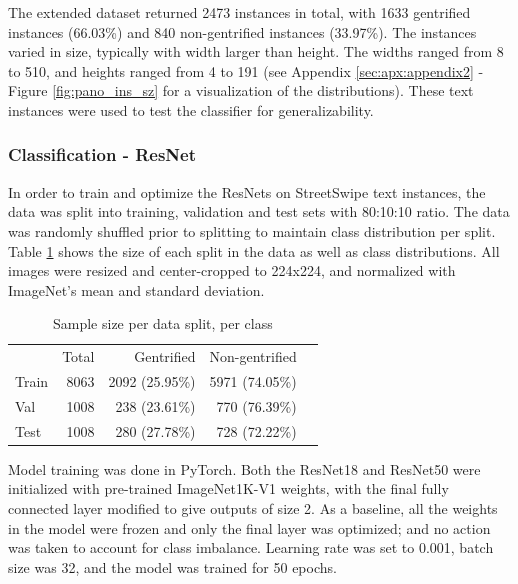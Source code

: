 The extended dataset returned 2473 instances in total, with 1633 gentrified instances (66.03\%) and 840 non-gentrified instances (33.97\%). The instances varied in size, typically with width larger than height. The widths ranged from 8 to 510, and heights ranged from 4 to 191 (see Appendix \ref{sec:apx:appendix2} - Figure \ref{fig:pano_ins_sz} for a visualization of the distributions). These text instances were used to test the classifier for generalizability.


\subsubsection{Classification - ResNet}

In order to train and optimize the ResNets on StreetSwipe text instances, the data was split into training, validation and test sets with 80:10:10 ratio. The data was randomly shuffled prior to splitting to maintain class distribution per split. Table \ref{tab:data_split} shows the size of each split in the data as well as class distributions. All images were resized and center-cropped to 224x224, and normalized with ImageNet's mean and standard deviation.

{
\setlength\intextsep{0pt}
\begin{table}
    \begin{tabular}{lrrrl}
    \toprule
            & \multicolumn{1}{r}{Total} &\multicolumn{1}{r}{Gentrified} & \multicolumn{1}{r}{Non-gentrified} \\ \cline{1-4}
Train       & 8063                      & 2092 (25.95\%)                & 5971 (74.05\%)      \\
Val         & 1008                      & 238 (23.61\%)                 & 770 (76.39\%)       \\
Test        & 1008                      & 280 (27.78\%)                 & 728 (72.22\%)       \\
    \bottomrule
    \end{tabular}
    \caption{Sample size per data split, per class}
    \label{tab:data_split}
\vspace{-10pt}
\end{table}
}

Model training was done in PyTorch. Both the ResNet18 and ResNet50 were initialized with pre-trained ImageNet1K-V1 weights, with the final fully connected layer modified to give outputs of size 2. As a baseline, all the weights in the model were frozen and only the final layer was optimized; and no action was taken to account for class imbalance. Learning rate was set to 0.001, batch size was 32, and the model was trained for 50 epochs.

